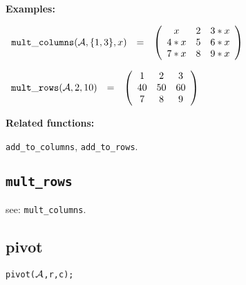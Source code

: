 {\bf Examples:}

\begin{flushleft}  
\hspace*{0.1in}
\begin{math}  
\begin{array}{ccc}
{\tt mult\_columns}({\cal A},\{1,3\},x) & = & 
        \left( \begin{array}{ccc} x & 2 & 3*x \\ 4*x & 5 & 6*x \\ 7*x & 
8 & 9*x 
 \end{array} \right) 
\end{array}
\end{math}  
\end{flushleft}

\vspace*{0.1in}

\begin{flushleft}  
\hspace*{0.1in}
\begin{math}  
\begin{array}{ccc}
{\tt mult\_rows}({\cal A},2,10) & = & 
        \left( \begin{array}{ccc} 1 & 2 & 3 \\ 40 & 50 & 60 \\ 7 & 8 & 
9 \end{array} \right) 
\end{array}
\end{math}  
\end{flushleft}

{\bf Related functions:}

\hspace*{0.175in} {\tt add\_to\_columns}, {\tt add\_to\_rows}.


\subsection{\tt mult\_rows}

\hspace*{0.175in} see: {\tt mult\_columns}.


\subsection{pivot}


\hspace*{0.175in} {\tt pivot(${\cal A}$,r,c);}

